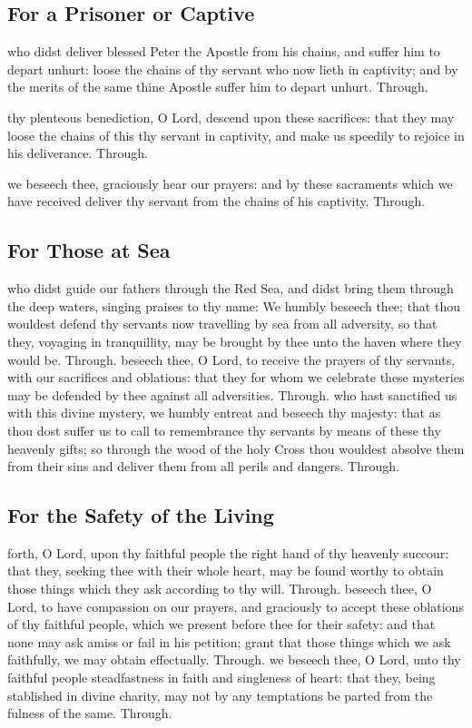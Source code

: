 \begin{multicols}{2}
\subsection{For a Prisoner or Captive}
\collect
{} who didst deliver blessed Peter the Apostle from his chains, and suffer him to depart unhurt: loose the chains of thy servant who now lieth in captivity; and by the merits of the same thine Apostle suffer him to depart unhurt. Through.

   \newcolumn

\secret
{} thy plenteous benediction, O Lord, descend upon these sacrifices: that they may loose the chains of this thy servant in captivity, and make us speedily to rejoice in his deliverance. Through.

\postcommunion
{} we beseech thee, graciously hear our prayers: and by these sacraments which we have received deliver thy servant from the chains of his captivity. Through.

\subsection{For Those at Sea}
\collect
{} who didst guide our fathers through the Red Sea, and didst bring them through the deep waters, singing praises to thy name: We humbly beseech thee; that thou wouldest defend thy servants now travelling by sea from all adversity, so that they, voyaging in tranquillity, may be brought by thee unto the haven where they would be. Through.
\secret
{} beseech thee, O Lord, to receive the prayers of thy servants, with our sacrifices and oblations: that they for whom we celebrate these mysteries may be defended by thee against all adversities. Through.
\postcommunion
{} who hast sanctified us with this divine mystery, we humbly entreat and beseech thy majesty: that as thou dost suffer us to call to remembrance thy servants by means of these thy heavenly gifts; so through the wood of the holy Cross thou wouldest absolve them from their sins and deliver them from all perils and dangers. Through.

\subsection{For the Safety of the Living}
\collect
{} forth, O Lord, upon thy faithful people the right hand of thy heavenly succour: that they, seeking thee with their whole heart, may be found worthy to obtain those things which they ask according to thy will. Through.
\secret
{} beseech thee, O Lord, to have compassion on our prayers, and graciously to accept these oblations of thy faithful people, which we present before thee for their safety: and that none may ask amiss or fail in his petition; grant that those things which we ask faithfully, we may obtain effectually. Through.
\postcommunion
{} we beseech thee, O Lord, unto thy faithful people steadfastness in faith and singleness of heart: that they, being stablished in divine charity, may not by any temptations be parted from the fulness of the same. Through.


\end{multicols}
